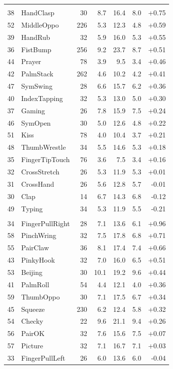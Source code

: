 \documentclass{article}
\begin{document}
\begin{table}[h]
\begin{tabular}{rlrrrrr}
\addlinespace[3pt]
\multicolumn{7}{l}{\textit{Symmetric bimanual gestures}} \\
38 & HandClasp       & 30  & 8.7 & 16.4 & 8.0 & +0.75 \\
52 & MiddleOppo      & 226 & 5.3 & 12.3 & 4.8 & +0.59 \\
39 & HandRub         & 32  & 5.9 & 16.0 & 5.3 & +0.55 \\
36 & FistBump        & 256 & 9.2 & 23.7 & 8.7 & +0.51 \\
44 & Prayer          & 78  & 3.9 & 9.5  & 3.4 & +0.46 \\
42 & PalmStack       & 262 & 4.6 & 10.2 & 4.2 & +0.41 \\
47 & SymSwing        & 28  & 6.6 & 15.7 & 6.2 & +0.36 \\
40 & IndexTapping    & 32  & 5.3 & 13.0 & 5.0 & +0.30 \\
37 & Gaming          & 26  & 7.8 & 15.9 & 7.5 & +0.24 \\
46 & SymOpen         & 30  & 5.0 & 12.6 & 4.8 & +0.22 \\
51 & Kiss            & 78  & 4.0 & 10.4 & 3.7 & +0.21 \\
48 & ThumbWrestle    & 34  & 5.5 & 14.6 & 5.3 & +0.18 \\
35 & FingerTipTouch  & 76  & 3.6 & 7.5  & 3.4 & +0.16 \\
32 & CrossStretch    & 26  & 5.3 & 11.9 & 5.3 & +0.01 \\
31 & CrossHand       & 26  & 5.6 & 12.8 & 5.7 & -0.01 \\
30 & Clap            & 14  & 6.7 & 14.3 & 6.8 & -0.12 \\
49 & Typing          & 34  & 5.3 & 11.9 & 5.5 & -0.21 \\

\addlinespace[3pt]
\multicolumn{7}{l}{\textit{Asymmetric bimanual gestures}} \\
34 & FingerPullRight & 28  & 7.1 & 13.6 & 6.1 & +0.96 \\
58 & PinchWring      & 32  & 7.5 & 17.8 & 6.8 & +0.71 \\
55 & PairClaw        & 36  & 8.1 & 17.4 & 7.4 & +0.66 \\
43 & PinkyHook       & 32  & 7.0 & 16.0 & 6.5 & +0.51 \\
53 & Beijing         & 30  & 10.1 & 19.2 & 9.6 & +0.44 \\
41 & PalmRoll        & 54  & 4.4 & 12.1 & 4.0 & +0.36 \\
59 & ThumbOppo       & 30  & 7.1 & 17.5 & 6.7 & +0.34 \\
45 & Squeeze         & 230 & 6.2 & 12.4 & 5.8 & +0.32 \\
54 & Checky          & 22  & 9.6 & 21.1 & 9.4 & +0.26 \\
56 & PairOK          & 32  & 7.6 & 15.6 & 7.5 & +0.07 \\
57 & Picture         & 32  & 7.1 & 16.7 & 7.1 & +0.03 \\
33 & FingerPullLeft  & 26  & 6.0 & 13.6 & 6.0 & -0.04 \\

\bottomrule
\end{tabular}
\end{table}
\end{document}
